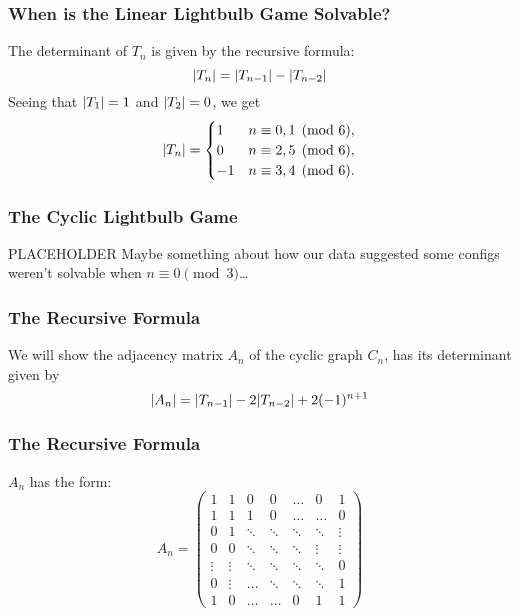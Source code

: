 \documentclass{beamer}
\newcommand{\off}{white}
\DeclarePairedDelimiter\abs{\lvert}{\rvert}%
\begin{document}
\begin{frame}
\frametitle{When is the Linear Lightbulb Game Solvable?}
The determinant of $T_n$ is given by the recursive formula:
\[
    \abs{T_n} = \abs{T_{n-1}} - \abs{T_{n-2}}
\]
\pause
Seeing that $\abs{T_1} = 1$ and $\abs{T_2} = 0$, we get
\[
    \abs{T_n} = 
    \begin{cases}
        1 & n \equiv 0, 1 \pmod{6},\\
        0 & n \equiv 2, 5 \pmod{6},\\
        -1 & n \equiv 3,4 \pmod{6}.
    \end{cases}
\]
\end{frame}

\begin{frame}
    \frametitle{The Cyclic Lightbulb Game}
    PLACEHOLDER
    Maybe something about how our data suggested some configs weren't solvable when
    $n\equiv 0 \pmod{3}$\ldots

\begin{figure}[!h]
    \centering
\end{figure}
\end{frame}


\begin{frame}
\frametitle{The Recursive Formula}

We will show the adjacency matrix $A_n$ of the cyclic graph $C_n$, has its determinant
given by
\[
    \abs{A_n} = \abs{T_{n-1}} - 2\abs{T_{n-2}} + 2(-1)^{n+1}
\]
\end{frame}

\begin{frame}
\frametitle{The Recursive Formula}
    $A_n$ has the form:
    \[
        A_n=
        \begin{pmatrix}
            1 & 1 & 0 & 0 & \dots & 0 & 1\\
            1 & 1 & 1 & 0 & \dots & \dots & 0\\
            0 & 1 & \ddots & \ddots & \ddots & \ddots & \vdots\\
            0 & 0 & \ddots & \ddots & \ddots & \vdots & \vdots\\
            \vdots & \vdots & \ddots & \ddots & \ddots & \ddots & 0\\
            0 & \vdots & \dots & \ddots & \ddots & \ddots & 1\\
            1 & 0 & \dots & \dots & 0 & 1 & 1
        \end{pmatrix}
    \]
\end{frame}
\end{document}

